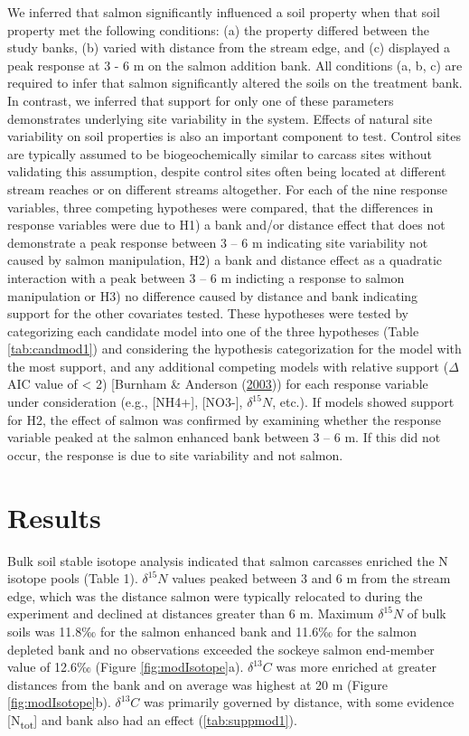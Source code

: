 \documentclass [11pt, proquest] {uwthesis}[2015/03/03]
\begin{document}
We inferred that salmon significantly influenced a soil property when
that soil property met the following conditions: (a) the property
differed between the study banks, (b) varied with distance from the
stream edge, and (c) displayed a peak response at 3 - 6 m on the salmon
addition bank. All conditions (a, b, c) are required to infer that
salmon significantly altered the soils on the treatment bank. In
contrast, we inferred that support for only one of these parameters
demonstrates underlying site variability in the system. Effects of
natural site variability on soil properties is also an important
component to test. Control sites are typically assumed to be
biogeochemically similar to carcass sites without validating this
assumption, despite control sites often being located at different
stream reaches or on different streams altogether. For each of the nine
response variables, three competing hypotheses were compared, that the
differences in response variables were due to H1) a bank and/or distance
effect that does not demonstrate a peak response between 3 -- 6 m
indicating site variability not caused by salmon manipulation, H2) a
bank and distance effect as a quadratic interaction with a peak between
3 -- 6 m indicting a response to salmon manipulation or H3) no
difference caused by distance and bank indicating support for the other
covariates tested. These hypotheses were tested by categorizing each
candidate model into one of the three hypotheses (Table
\ref{tab:candmod1}) and considering the hypothesis categorization for
the model with the most support, and any additional competing models
with relative support (\(\Delta\)AIC value of \textless{} 2) {[}Burnham
\& Anderson (\protect\hyperlink{ref-Burnham2003}{2003})) for each
response variable under consideration (e.g., {[}NH4+{]}, {[}NO3-{]},
\(\delta^{15}N\), etc.). If models showed support for H2, the effect of
salmon was confirmed by examining whether the response variable peaked
at the salmon enhanced bank between 3 -- 6 m. If this did not occur, the
response is due to site variability and not salmon.

\section{Results}\label{results}

Bulk soil stable isotope analysis indicated that salmon carcasses
enriched the N isotope pools (Table 1). \(\delta^{15}N\) values peaked
between 3 and 6 m from the stream edge, which was the distance salmon
were typically relocated to during the experiment and declined at
distances greater than 6 m. Maximum \(\delta^{15}N\) of bulk soils was
11.8‰ for the salmon enhanced bank and 11.6‰ for the salmon depleted
bank and no observations exceeded the sockeye salmon end-member value of
12.6‰ (Figure \ref{fig:modIsotope}a). \(\delta^{13}C\) was more enriched
at greater distances from the bank and on average was highest at 20 m
(Figure \ref{fig:modIsotope}b). \(\delta^{13}C\) was primarily governed
by distance, with some evidence {[}N\textsubscript{tot}{]} and bank also
had an effect (\ref{tab:suppmod1}).
\end{document}
